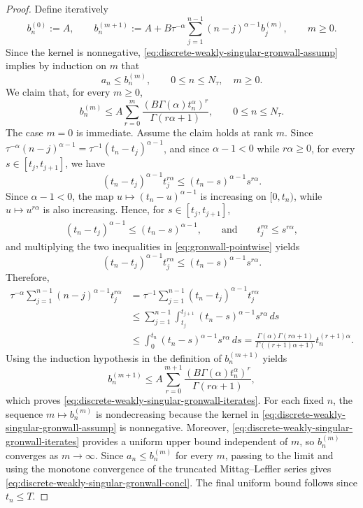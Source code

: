 \documentclass[letterpaper]{article}
\numberwithin{equation}{section}
\theoremstyle{definition}
\theoremstyle{remark}
\begin{document}
\begin{proof}
Define iteratively
\[
  b_n^{(0)}:=A,
  \qquad
  b_n^{(m+1)}
  :=
  A+B\tau^{-\alpha}\sum_{j=1}^{n-1}(n-j)^{\alpha-1}b_j^{(m)},
  \qquad m\ge0.
\]
Since the kernel is nonnegative,
\eqref{eq:discrete-weakly-singular-gronwall-assump} implies by induction on
$m$ that
\[
  a_n\le b_n^{(m)},
  \qquad 0\le n\le N_\tau,\quad m\ge0.
\]
We claim that, for every $m\ge0$,
\begin{equation}\label{eq:discrete-weakly-singular-gronwall-iterates}
  b_n^{(m)}
  \le
  A\sum_{r=0}^{m}
  \frac{\left(B\Gamma(\alpha)t_n^\alpha\right)^r}{\Gamma(r\alpha+1)},
  \qquad 0\le n\le N_\tau.
\end{equation}
The case $m=0$ is immediate. Assume the claim holds at rank $m$. Since
$\tau^{-\alpha}(n-j)^{\alpha-1}
  =
  \tau^{-1}(t_n-t_j)^{\alpha-1}$,
and since $\alpha-1<0$ while $r\alpha\ge0$, for every
$s\in[t_j,t_{j+1}]$, we have
\[
  (t_n-t_j)^{\alpha-1}t_j^{r\alpha}
  \le
  (t_n-s)^{\alpha-1}s^{r\alpha}.
\]
Since $\alpha-1<0$, the map $u\mapsto (t_n-u)^{\alpha-1}$ is increasing on
$[0,t_n)$, while $u\mapsto u^{r\alpha}$ is also increasing. Hence, for
$s\in[t_j,t_{j+1}]$,
\begin{align}
  (t_n-t_j)^{\alpha-1}\le (t_n-s)^{\alpha-1},
\qquad\text{and}\qquad
  t_j^{r\alpha}\le s^{r\alpha},
  \label{eq:gronwall-pointwise}
\end{align}
and multiplying the two inequalities in \eqref{eq:gronwall-pointwise} yields
\[
  (t_n-t_j)^{\alpha-1}t_j^{r\alpha}
  \le
  (t_n-s)^{\alpha-1}s^{r\alpha}.
\]
Therefore,
\begin{align*}
  \tau^{-\alpha}\sum_{j=1}^{n-1}(n-j)^{\alpha-1}t_j^{r\alpha}
  &=
  \tau^{-1}\sum_{j=1}^{n-1}(t_n-t_j)^{\alpha-1}t_j^{r\alpha}
  \\
  &\le
  \sum_{j=1}^{n-1}\int_{t_j}^{t_{j+1}}(t_n-s)^{\alpha-1}s^{r\alpha}\,ds
  \\
  &\le
  \int_0^{t_n}(t_n-s)^{\alpha-1}s^{r\alpha}\,ds
 =
  \frac{\Gamma(\alpha)\Gamma(r\alpha+1)}{\Gamma((r+1)\alpha+1)}
  t_n^{(r+1)\alpha}.
\end{align*}
Using the induction hypothesis in the definition of $b_n^{(m+1)}$ yields
\[
  b_n^{(m+1)}
  \le
  A\sum_{r=0}^{m+1}
  \frac{\left(B\Gamma(\alpha)t_n^\alpha\right)^r}{\Gamma(r\alpha+1)},
\]
which proves \eqref{eq:discrete-weakly-singular-gronwall-iterates}. For each
fixed $n$, the sequence $m\mapsto b_n^{(m)}$ is nondecreasing because the
kernel in \eqref{eq:discrete-weakly-singular-gronwall-assump} is nonnegative.
Moreover, \eqref{eq:discrete-weakly-singular-gronwall-iterates} provides a
uniform upper bound independent of $m$, so $b_n^{(m)}$ converges as
$m\to\infty$. Since $a_n\le b_n^{(m)}$ for every $m$, passing to the limit and
using the monotone convergence of the truncated Mittag--Leffler series gives
\eqref{eq:discrete-weakly-singular-gronwall-concl}. The final uniform bound
follows since $t_n\le T$.
\end{proof}
\end{document}
